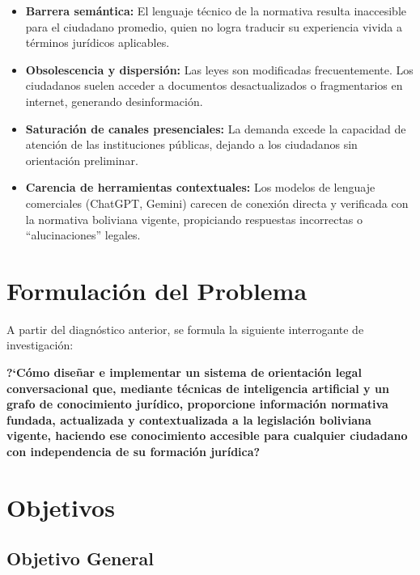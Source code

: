 \documentclass[12pt, letterpaper]{report}
\begin{document}
\begin{itemize}
  \item \textbf{Barrera sem\'{a}ntica:} El lenguaje t\'{e}cnico de la normativa resulta inaccesible para el ciudadano promedio, quien no logra traducir su experiencia vivida a t\'{e}rminos jur\'{i}dicos aplicables.

  \item \textbf{Obsolescencia y dispersi\'{o}n:} Las leyes son modificadas frecuentemente. Los ciudadanos suelen acceder a documentos desactualizados o fragmentarios en internet, generando desinformaci\'{o}n.

  \item \textbf{Saturaci\'{o}n de canales presenciales:} La demanda excede la capacidad de atenci\'{o}n de las instituciones p\'{u}blicas, dejando a los ciudadanos sin orientaci\'{o}n preliminar.

  \item \textbf{Carencia de herramientas contextuales:} Los modelos de lenguaje comerciales (ChatGPT, Gemini) carecen de conexi\'{o}n directa y verificada con la normativa boliviana vigente, propiciando respuestas incorrectas o ``alucinaciones'' legales.
\end{itemize}

\section{Formulaci\'{o}n del Problema}

A partir del diagn\'{o}stico anterior, se formula la siguiente interrogante de investigaci\'{o}n:

\textbf{?`C\'{o}mo dise\~{n}ar e implementar un sistema de orientaci\'{o}n legal conversacional que, mediante t\'{e}cnicas de inteligencia artificial y un grafo de conocimiento jur\'{i}dico, proporcione informaci\'{o}n normativa fundada, actualizada y contextualizada a la legislaci\'{o}n boliviana vigente, haciendo ese conocimiento accesible para cualquier ciudadano con independencia de su formaci\'{o}n jur\'{i}dica?}

\section{Objetivos}

\subsection{Objetivo General}
\end{document}
